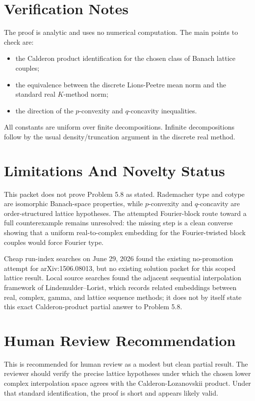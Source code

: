 \documentclass[11pt]{article}
\begin{document}
\section*{Verification Notes}

The proof is analytic and uses no numerical computation.  The main points to
check are:
\begin{itemize}
\item the Calderon product identification for the chosen class of Banach
  lattice couples;
\item the equivalence between the discrete Lions-Peetre mean norm and the
  standard real \(K\)-method norm;
\item the direction of the \(p\)-convexity and \(q\)-concavity inequalities.
\end{itemize}
All constants are uniform over finite decompositions.  Infinite decompositions
follow by the usual density/truncation argument in the discrete real method.

\section*{Limitations And Novelty Status}

This packet does not prove Problem 5.8 as stated.  Rademacher type and cotype
are isomorphic Banach-space properties, while \(p\)-convexity and
\(q\)-concavity are order-structured lattice hypotheses.  The attempted
Fourier-block route toward a full counterexample remains unresolved: the
missing step is a clean converse showing that a uniform real-to-complex
embedding for the Fourier-twisted block couples would force Fourier type.

Cheap run-index searches on June 29, 2026 found the existing no-promotion
attempt for arXiv:1506.08013, but no existing solution packet for this scoped
lattice result.  Local source searches found the adjacent sequential
interpolation framework of Lindemulder--Lorist, which records related
embeddings between real, complex, gamma, and lattice sequence methods; it does
not by itself state this exact Calderon-product partial answer to Problem 5.8.

\section*{Human Review Recommendation}

This is recommended for human review as a modest but clean partial result.
The reviewer should verify the precise lattice hypotheses under which the
chosen lower complex interpolation space agrees with the
Calderon-Lozanovskii product.  Under that standard identification, the proof
is short and appears likely valid.
\end{document}
